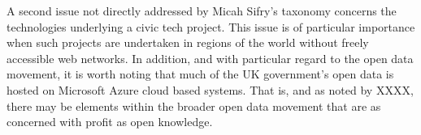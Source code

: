 A second issue not directly addressed by Micah Sifry’s taxonomy concerns the technologies underlying a civic tech project.
This issue is of particular importance when such projects are undertaken in regions of the world without freely accessible web networks.
In addition, and with particular regard to the open data movement, it is worth noting that much of the UK government's open data is hosted on Microsoft Azure cloud based systems.
That is, and as noted by XXXX, there may be elements within the broader open data movement that are as concerned with profit as open knowledge. 